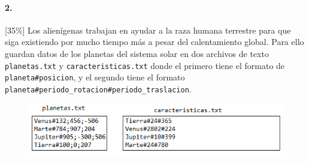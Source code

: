 \paragraph{2.} 
[35\%] Los alienígenas trabajan en ayudar a la raza humana terrestre para que siga existiendo por mucho tiempo más a pesar del calentamiento global. Para ello guardan datos de los planetas del sistema solar en dos archivos de texto \texttt{planetas.txt} y \texttt{caracteristicas.txt} donde el primero tiene el formato de \texttt{planeta\#posicion}, y el segundo tiene el formato \texttt{planeta\#periodo\_rotacion\#periodo\_traslacion}.

\begin{figure}[h]
    \centering
    \includegraphics{Imagenes/planetas.png}
    
\end{figure}

